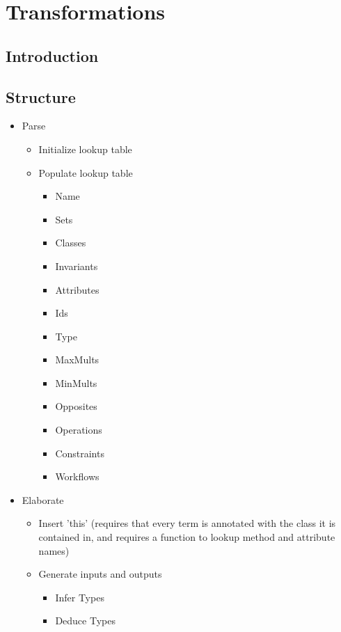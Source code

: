 \chapter{Transformations}

\section{Introduction}

\section{Structure}

\begin{itemize}
  \item Parse
  \begin{itemize}
    \item Initialize lookup table
    \item Populate lookup table
    \begin{itemize}
      \item Name
      \item Sets
      \item Classes
      \item Invariants
      \item Attributes
      \item Ids
      \item Type
      \item MaxMults
      \item MinMults
      \item Opposites
      \item Operations
      \item Constraints
      \item Workflows
    \end{itemize}
  \end{itemize}
  \item Elaborate
  \begin{itemize}
    \item Insert 'this'
     (requires that every term is annotated with the class it is contained in, 
      and requires a function to lookup method and attribute names) 
    \item Generate inputs and outputs
    \begin{itemize}
      \item Infer Types
      \item Deduce Types
    \end{itemize}

\end{itemize}
\end{itemize}
